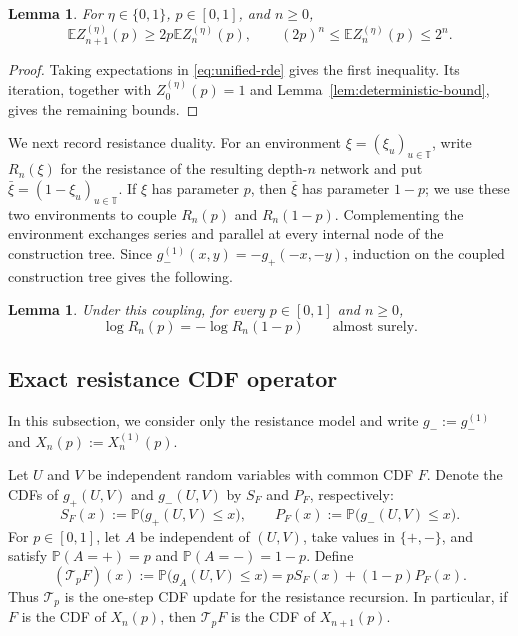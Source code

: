 \documentclass[12pt]{amsart}
\numberwithin{equation}{section}
\theoremstyle{plain}
\newtheorem{lemma}[theorem]{Lemma}
\theoremstyle{definition}
\newcommand{\E}{\mathbb E}
\newcommand{\Pp}{\mathbb P}
\begin{document}
\begin{lemma}
\label{lem:first-moment-bounds}
For $\eta\in\{0,1\}$, $p\in[0,1]$, and $n\ge0$,
\begin{equation}
 \E Z_{n+1}^{(\eta)}(p)\ge2p\E Z_n^{(\eta)}(p),
 \qquad
 (2p)^n\le\E Z_n^{(\eta)}(p)\le2^n.
 \label{eq:first-moment-recursion}
\end{equation}
\end{lemma}

\begin{proof}
Taking expectations in \eqref{eq:unified-rde} gives the first inequality.
Its iteration, together with $Z_0^{(\eta)}(p)=1$ and
Lemma~\ref{lem:deterministic-bound}, gives the remaining bounds.
\end{proof}

We next record resistance duality.  For an
environment $\xi=(\xi_u)_{u\in\mathbb T}$, write $R_n(\xi)$ for the
resistance of the resulting depth-$n$ network and put
$\bar\xi=(1-\xi_u)_{u\in\mathbb T}$.  If $\xi$ has parameter $p$, then
$\bar\xi$ has parameter $1-p$; we use these two environments to couple
$R_n(p)$ and $R_n(1-p)$.  Complementing the environment exchanges series
and parallel at every internal node of the construction tree.  Since
$g_-^{(1)}(x,y)=-g_+(-x,-y)$, induction on the coupled construction
tree gives the following.

\begin{lemma}
\label{lem:resistance-duality}
Under this coupling, for every $p\in[0,1]$ and $n\ge0$,
\begin{equation}
 \log R_n(p)=-\log R_n(1-p)
 \qquad\text{almost surely}.
 \label{eq:resistance-duality}
\end{equation}
\end{lemma}

\subsection{Exact resistance CDF operator}
\label{sec:cdf-operator}

In this subsection, we consider only the resistance model and write
$g_-:=g_-^{(1)}$ and $X_n(p):=X_n^{(1)}(p)$.

Let $U$ and $V$ be independent random variables with common CDF $F$.  Denote
the CDFs of $g_+(U,V)$ and $g_-(U,V)$ by $S_F$ and $P_F$, respectively:
\[
 S_F(x):=\Pp\bigl(g_+(U,V)\le x\bigr),
 \qquad
 P_F(x):=\Pp\bigl(g_-(U,V)\le x\bigr).
\]
For $p\in[0,1]$, let $A$ be independent of $(U,V)$, take values in
$\{+,-\}$, and satisfy $\Pp(A=+)=p$ and $\Pp(A=-)=1-p$.  Define
\begin{equation}
 (\mathcal T_pF)(x):=\Pp\bigl(g_A(U,V)\le x\bigr)
 =pS_F(x)+(1-p)P_F(x).
 \label{eq:CDF-operator-definition}
\end{equation}
Thus $\mathcal T_p$ is the one-step CDF update for the resistance recursion.
In particular, if $F$ is the CDF of $X_n(p)$, then $\mathcal T_pF$ is the
CDF of $X_{n+1}(p)$.
\end{document}
